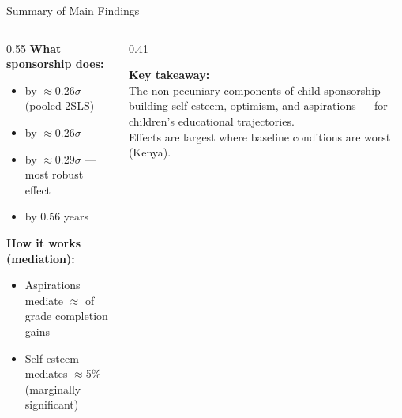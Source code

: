 \documentclass[aspectratio=169, 10pt]{beamer}
\begin{document}
\begin{frame}{Summary of Main Findings}
  \begin{columns}
    \begin{column}{0.55\textwidth}
      \textbf{What sponsorship does:}
      \begin{itemize}
        \item {} by $\approx$0.26$\sigma$ (pooled 2SLS)
        \item {} by $\approx$0.26$\sigma$
        \item {} by $\approx$0.29$\sigma$ --- most robust effect
        \item {} by 0.56 years
      \end{itemize}
      \vspace{0.5em}
      \textbf{How it works (mediation):}
      \begin{itemize}
        \item Aspirations mediate $\approx$ of grade completion gains
        \item Self-esteem mediates $\approx$5\% (marginally significant)
      \end{itemize}
    \end{column}
    \begin{column}{0.41\textwidth}
      \begin{resultbox}
        \textbf{Key takeaway:}\\[0.4em]
        The non-pecuniary components of child sponsorship --- building self-esteem, optimism, and aspirations ---  for children's educational trajectories.\\[0.5em]
        Effects are largest where baseline conditions are worst (Kenya).
      \end{resultbox}
    \end{column}
  \end{columns}
\end{frame}
\end{document}
